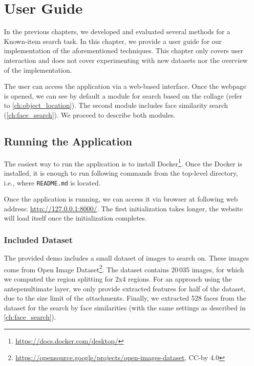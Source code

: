 \chapter{User Guide}
\label{ch:user_guide}

In the previous chapters, we developed and evaluated several methods for a Known-item search task. In this chapter, we provide a user guide for our implementation of the aforementioned techniques. This chapter only covers user interaction and does not cover experimenting with new datasets nor the overview of the implementation.

The user can access the application via a web-based interface. Once the webpage is opened, we can see by default a module for search based on the collage (refer to \autoref{ch:object_location}). The second module includes face similarity search (\autoref{ch:face_search}). We proceed to describe both modules.

\section{Running the Application}

The easiest way to run the application is to install Docker\footnote{\url{https://docs.docker.com/desktop/}}. Once the Docker is installed, it is enough to run following commands from the top-level directory, i.e., where \verb+README.md+ is located.

\vspace{0.5cm}


\vspace{0.5cm}

Once the application is running, we can access it via browser at following web address: \url{http://127.0.0.1:8000/}. The first initialization takes longer, the website will load itself once the initialization completes. 

\subsection*{Included Dataset}

The provided demo includes a small dataset of images to search on. These images come from Open Image Dataset\footnote{\url{https://opensource.google/projects/open-images-dataset}, CC-by 4.0}. The dataset contains 20\,035 images, for which we computed the region splitting for 2x4 regions. For an approach using the antepenultimate layer, we only provide extracted features for half of the dataset, due to the size limit of the attachments. Finally, we extracted 528 faces from the dataset for the search by face similarities (with the same settings as described in \autoref{ch:face_search}).

